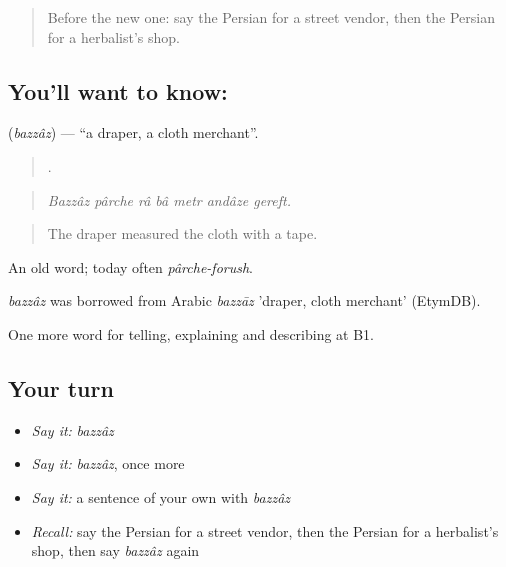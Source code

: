 \label{lesson:FA-C458-bazzaz}



\begin{quote}
Before the new one: say the Persian for a street vendor, then the Persian for a herbalist's shop.
\end{quote}

\subsection*{You'll want to know: }
\textbf{} (\emph{bazzâz}) — \textquotedblleft{}a draper, a cloth merchant\textquotedblright{}.

\begin{quote}
      .
\end{quote}

\begin{quote}
\emph{Bazzâz pârche râ bâ metr andâze gereft.}
\end{quote}

\begin{quote}
The draper measured the cloth with a tape.
\end{quote}

An old word; today often \emph{pârche-forush}.

\begin{cousinweb}
\emph{bazzâz} was borrowed from Arabic \emph{bazzāz} 'draper, cloth merchant' (EtymDB).
\end{cousinweb}

\begin{grammarlens}[title={What you've built}]
One more word for telling, explaining and describing at B1.
\end{grammarlens}

\subsection*{Your turn}
\begin{itemize}
\raggedright
  \item \emph{Say it:} \emph{bazzâz}
  \item \emph{Say it:} \emph{bazzâz}, once more
  \item \emph{Say it:} a sentence of your own with \emph{bazzâz}
  \item \emph{Recall:} say the Persian for a street vendor, then the Persian for a herbalist's shop, then say \emph{bazzâz} again
\end{itemize}

